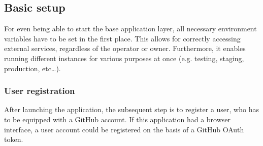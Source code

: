 
\subsection{Basic setup}
For even being able to start the base application layer, all necessary environment variables have to be set in the first place. This allows for correctly accessing external services, regardless of the operator or owner. Furthermore, it enables running different instances for various purposes at once (e.g. testing, staging, production, etc\ldots).

\subsubsection{User registration}
After launching the application, the subsequent step is to register a user, who has to be equipped with a GitHub account. If this application had a browser interface, a user account could be registered on the basis of a GitHub OAuth token.
